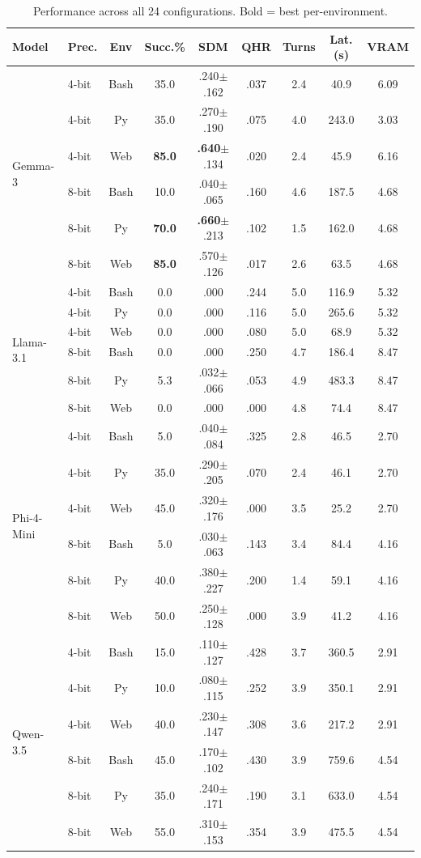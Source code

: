 \documentclass{article}
\begin{document}
\begin{table}[h]
\caption{Performance across all 24 configurations. Bold = best per-environment.}
\label{tab:results}
\centering
\scriptsize
\begin{tabular}{@{}llccccccc@{}}
\toprule
Model & Prec. & Env & Succ.\% & SDM & QHR & Turns & Lat. (s) & VRAM \\
\midrule
\multirow{6}{*}{Gemma-3}
 & 4-bit & Bash & 35.0 & .240$\pm$.162 & .037 & 2.4 & 40.9 & 6.09 \\
 & 4-bit & Py & 35.0 & .270$\pm$.190 & .075 & 4.0 & 243.0 & 3.03 \\
 & 4-bit & Web & \textbf{85.0} & \textbf{.640}$\pm$.134 & .020 & 2.4 & 45.9 & 6.16 \\
 & 8-bit & Bash & 10.0 & .040$\pm$.065 & .160 & 4.6 & 187.5 & 4.68 \\
 & 8-bit & Py & \textbf{70.0} & \textbf{.660}$\pm$.213 & .102 & 1.5 & 162.0 & 4.68 \\
 & 8-bit & Web & \textbf{85.0} & .570$\pm$.126 & .017 & 2.6 & 63.5 & 4.68 \\
\midrule
\multirow{6}{*}{Llama-3.1}
 & 4-bit & Bash & 0.0 & .000 & .244 & 5.0 & 116.9 & 5.32 \\
 & 4-bit & Py & 0.0 & .000 & .116 & 5.0 & 265.6 & 5.32 \\
 & 4-bit & Web & 0.0 & .000 & .080 & 5.0 & 68.9 & 5.32 \\
 & 8-bit & Bash & 0.0 & .000 & .250 & 4.7 & 186.4 & 8.47 \\
 & 8-bit & Py & 5.3 & .032$\pm$.066 & .053 & 4.9 & 483.3 & 8.47 \\
 & 8-bit & Web & 0.0 & .000 & .000 & 4.8 & 74.4 & 8.47 \\
\midrule
\multirow{6}{*}{Phi-4-Mini}
 & 4-bit & Bash & 5.0 & .040$\pm$.084 & .325 & 2.8 & 46.5 & 2.70 \\
 & 4-bit & Py & 35.0 & .290$\pm$.205 & .070 & 2.4 & 46.1 & 2.70 \\
 & 4-bit & Web & 45.0 & .320$\pm$.176 & .000 & 3.5 & 25.2 & 2.70 \\
 & 8-bit & Bash & 5.0 & .030$\pm$.063 & .143 & 3.4 & 84.4 & 4.16 \\
 & 8-bit & Py & 40.0 & .380$\pm$.227 & .200 & 1.4 & 59.1 & 4.16 \\
 & 8-bit & Web & 50.0 & .250$\pm$.128 & .000 & 3.9 & 41.2 & 4.16 \\
\midrule
\multirow{6}{*}{Qwen-3.5}
 & 4-bit & Bash & 15.0 & .110$\pm$.127 & .428 & 3.7 & 360.5 & 2.91 \\
 & 4-bit & Py & 10.0 & .080$\pm$.115 & .252 & 3.9 & 350.1 & 2.91 \\
 & 4-bit & Web & 40.0 & .230$\pm$.147 & .308 & 3.6 & 217.2 & 2.91 \\
 & 8-bit & Bash & 45.0 & .170$\pm$.102 & .430 & 3.9 & 759.6 & 4.54 \\
 & 8-bit & Py & 35.0 & .240$\pm$.171 & .190 & 3.1 & 633.0 & 4.54 \\
 & 8-bit & Web & 55.0 & .310$\pm$.153 & .354 & 3.9 & 475.5 & 4.54 \\
\bottomrule
\end{tabular}
\end{table}
\end{document}
